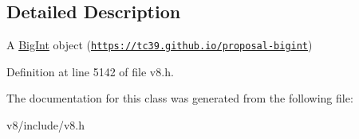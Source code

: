 \subsection{Detailed Description}
A \mbox{\hyperlink{classv8_1_1BigInt}{Big\+Int}} object (\href{https://tc39.github.io/proposal-bigint}{\tt https\+://tc39.\+github.\+io/proposal-\/bigint}) 

Definition at line 5142 of file v8.\+h.



The documentation for this class was generated from the following file\+:\begin{DoxyCompactItemize}
\item 
v8/include/v8.\+h\end{DoxyCompactItemize}
